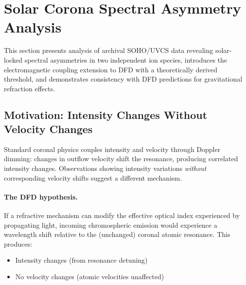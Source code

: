 
\section{Solar Corona Spectral Asymmetry Analysis}\label{sec:solar-corona}

This section presents analysis of archival SOHO/UVCS data revealing solar-locked 
spectral asymmetries in two independent ion species, introduces the electromagnetic 
coupling extension to DFD with a theoretically derived threshold, and demonstrates 
consistency with DFD predictions for gravitational refraction effects.

\subsection{Motivation: Intensity Changes Without Velocity Changes}\label{sec:uvcs-motivation}

Standard coronal physics couples intensity and velocity through Doppler dimming: 
changes in outflow velocity shift the resonance, producing correlated intensity 
changes. Observations showing intensity variations \emph{without} corresponding 
velocity shifts suggest a different mechanism.

\paragraph{The DFD hypothesis.}
If a refractive mechanism can modify the effective optical index experienced by 
propagating light, incoming chromospheric emission would experience a wavelength 
shift relative to the (unchanged) coronal atomic resonance. This produces:
\begin{itemize}[nosep]
\item Intensity changes (from resonance detuning)
\item No velocity changes (atomic velocities unaffected)
\end{itemize}

